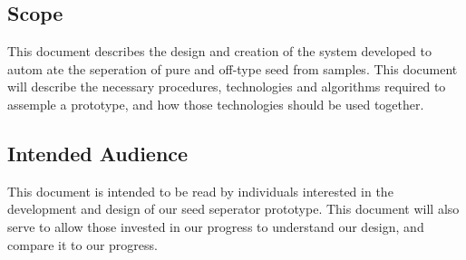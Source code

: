 \subsection {Scope}

This document describes the design and creation of the system developed to autom
ate the seperation of pure and off-type seed from samples. 
This document will describe the necessary procedures, technologies and algorithms required to assemple a prototype, 
and how those technologies should be used together.

\subsection {Intended Audience}

This document is intended to be read by individuals interested in the development and design of our seed
seperator prototype. This document will also serve to allow those invested in our progress to understand our design,
and compare it to our progress. 


